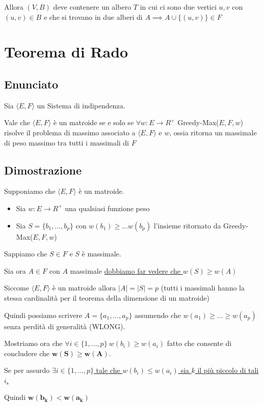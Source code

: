 Allora $(V,B)$ deve contenere un albero $T$ in cui ci sono due vertici $u,v$ con $(u,v) \in B$ e che si trovano in due alberi di $A \implies A \cup \{(u,v)\} \in F$

\newpage
\section{Teorema di Rado}
\subsection{Enunciato}
Sia $\langle E,F \rangle$ un Sistema di indipendenza.

Vale che $\langle E,F \rangle$ è un matroide se e solo se $\forall w : E \to R^+$ Greedy-Max($E,F,w$) risolve il problema di massimo associato a $\langle E,F \rangle$ e $w$, ossia ritorna un massimale di peso massimo tra tutti i massimali di $F$

\subsection{Dimostrazione}
Supponiamo che $\langle E, F \rangle$ è un matroide.

\begin{itemize}
    \item Sia $w:E \to R^+$ una qualsiasi funzione peso 
    \item Sia $S = \{b_1, \dots, b_p\}$ con $w(b_1) \geq \dots w(b_p)$ l'insieme ritornato da Greedy-Max($E,F,w$)
\end{itemize}

Sappiamo che $S \in F$ e $S$ è massimale.

Sia ora $A \in F$ con $A$ massimale \uline{dobbiamo far vedere che $w(S) \geq w(A)$}

Siccome $\langle E,F \rangle$ è un matroide allora $|A|=|S|=p$ (tutti i massimali hanno la stessa cardinalità per il teorema della dimensione di un matroide)

Quindi possiamo scrivere $A = \{a_1, \dots, a_p\}$ assumendo che $w(a_1) \geq \dots \geq w(a_p)$ senza perdità di generalità (WLONG).

Mostriamo ora che \uline{$\forall i \in \{1, \dots, p\}\ w(b_i) \geq w(a_i)$} fatto che consente di concludere che $\mathbf{w(S) \geq w(A)}$.

Se per assurdo \uline{$\exists i \in \{1, \dots, p\}$ tale che $w(b_i) \leq w(a_i)$ sia $k$ il più piccolo di tali $i$.}

Quindi $\mathbf{w(b_k) < w(a_k)}$


